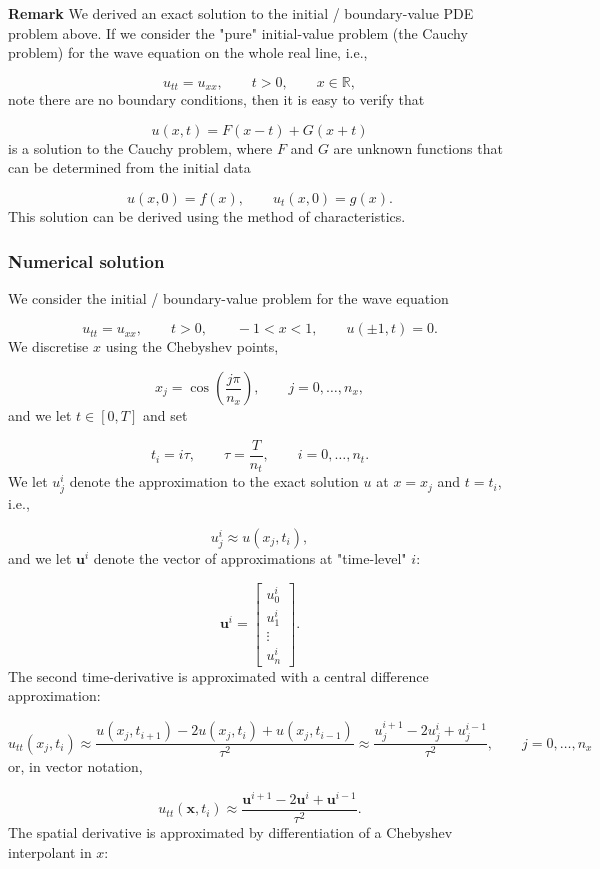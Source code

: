 \documentclass[12pt,a4paper]{article}
\begin{document}
\textbf{Remark} We derived an exact solution to the initial / boundary-value PDE problem above.  If we consider the "pure" initial-value problem (the Cauchy problem) for the wave equation on the whole real line, i.e., 

\[
u_{tt} = u_{xx}, \qquad t > 0, \qquad x \in \mathbb{R},
\]
note there are no boundary conditions, then it is easy to verify that 

\[
u(x,t) = F(x-t) + G(x+t)
\]
is a solution to the Cauchy problem, where $F$ and $G$ are unknown functions that can be determined from the initial data

\[
u(x,0) = f(x), \qquad u_t(x,0) = g(x).
\]
This solution can be derived using the method of characteristics. 

\subsubsection{Numerical solution}
We consider the initial / boundary-value problem for the wave equation

\[
u_{tt} = u_{xx}, \qquad t > 0, \qquad -1 < x < 1, \qquad u(\pm 1, t) = 0.
\]
We discretise $x$ using the Chebyshev points,

\[
x_j =  \cos\left(  \frac{j\pi}{n_x}\right), \qquad j = 0, \ldots, n_x, 
\]
and we let $t \in [0, T]$ and set

\[
t_i = i\tau, \qquad \tau = \frac{T}{n_t}, \qquad i = 0, \ldots, n_t.
\]
We let $u^{i}_j$ denote the approximation to the exact solution $u$ at $x=x_j$ and $t = t_i$, i.e.,

\[
u^{i}_j \approx u(x_j, t_i),
\]
and we let $\mathbf{u}^{i}$ denote the vector of approximations at "time-level" $i$:

\[
\mathbf{u}^{i} = \begin{bmatrix}
u^{i}_0 \\
u^{i}_1 \\
\vdots \\
u^{i}_n
\end{bmatrix}.
\]
The second time-derivative is approximated with a central difference approximation:

\[
u_{tt}(x_j,t_i) \approx \frac{u(x_j,t_{i+1}) - 2u(x_j,t_{i}) + u(x_j,t_{i-1})}{\tau^2} \approx \frac{u^{i+1}_j - 2u^{i}_j + u^{i-1}_j}{\tau^2}, \qquad j = 0, \ldots, n_x
\]
or, in vector notation,

\[
u_{tt}(\mathbf{x},t_i) \approx \frac{\mathbf{u}^{i+1} - 2\mathbf{u}^{i} + \mathbf{u}^{i-1}}{\tau^2}.
\]
The spatial derivative is approximated by differentiation of a Chebyshev interpolant in $x$: 
\end{document}

